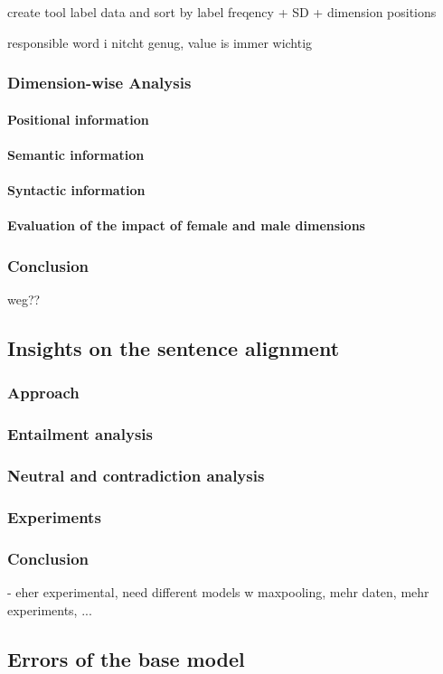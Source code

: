 create tool
label data and sort by label freqency + SD + dimension positions

responsible word i nitcht genug, value is immer wichtig
\subsubsection{Dimension-wise Analysis}
\paragraph{Positional information}
\paragraph{Semantic information}
\paragraph{Syntactic information}
\paragraph{Evaluation of the impact of female and male dimensions}
\subsubsection{Conclusion}
weg??
\subsection{Insights on the sentence alignment}\label{sec:insights_sent_alignment}
\subsubsection{Approach}
\subsubsection{Entailment analysis}
\subsubsection{Neutral and contradiction analysis}
\subsubsection{Experiments}
\subsubsection{Conclusion}
- eher experimental, need different models w maxpooling, mehr daten, mehr experiments, ...
\subsection{Errors of the base model}